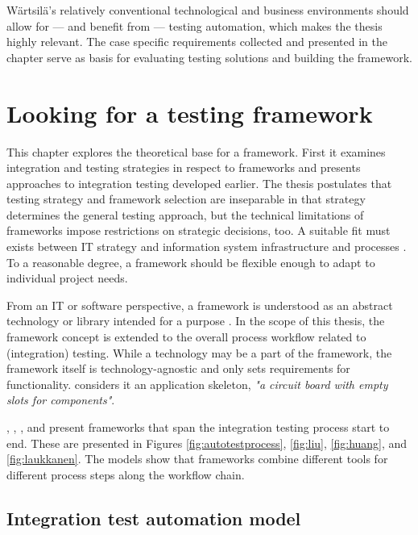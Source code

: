 \documentclass[12pt,a4paper,oneside,pdftex]{report}
\begin{document}
Wärtsilä's relatively conventional technological and business environments should allow for --- and benefit from --- testing automation, which makes the thesis highly relevant. The case specific requirements collected and presented in the chapter serve as basis for evaluating testing solutions and building the framework.

\chapter{Looking for a testing framework}
\label{chapter:frameworktheory}

This chapter explores the theoretical base for a framework. First it examines integration and testing strategies in respect to frameworks and presents approaches to integration testing developed earlier. The thesis postulates that testing strategy and framework selection are inseparable in that strategy determines the general testing approach, but the technical limitations of frameworks impose restrictions on strategic decisions, too. A suitable fit must exists between IT strategy and information system infrastructure and processes \citep{henderson1993strategic}. To a reasonable degree, a framework should be flexible enough to adapt to individual project needs.


From an IT or software perspective, a framework is understood as an abstract technology or library intended for a purpose \citep{johnson1988designing}. In the scope of this thesis, the framework concept is extended to the overall process workflow related to (integration) testing. While a technology may be a part of the framework, the framework itself is technology-agnostic and only sets requirements for functionality. \citet{pezze2008software} considers it an application skeleton, \textit{"a circuit board with empty slots for components"}. 

\citet{fewster1999software}, \citet{liu2009unified}, \citet{huang2008surrogate}, and \citet{laukkanen2006data} present frameworks that span the integration testing process start to end. These are presented in Figures \ref{fig:autotestprocess}, \ref{fig:liu}, \ref{fig:huang}, and \ref{fig:laukkanen}. The models show that frameworks combine different tools for different process steps along the workflow chain.

\section{Integration test automation model}
\end{document}
